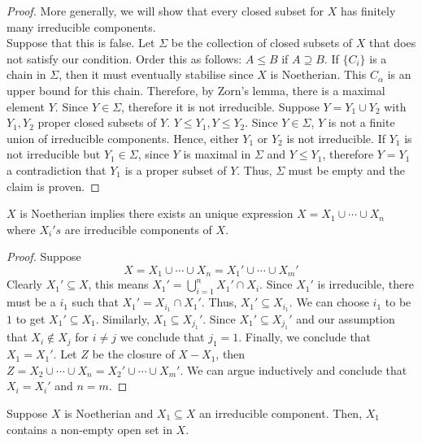 \documentclass[oneside, 12pt, ]{scrbook}
\theoremstyle{theorem}
\begin{document}
\begin{proof}
More generally, we will show that every closed subset for $X$ has finitely many irreducible components. \\

Suppose that this is false. Let $\Sigma$ be the collection of closed subsets of $X$ that does not satisfy our condition. Order this as follows: $A \le B$ if $A \supseteq B$. If $\{C_{i}\}$ is a chain in $\Sigma$, then it must eventually stabilise since $X$ is Noetherian. This $C_{\alpha}$ is an upper bound for this chain. Therefore, by Zorn's lemma, there is a maximal element $Y$. Since $Y \in \Sigma$, therefore it is not irreducible. Suppose $Y = Y_{1} \cup Y_{2}$ with $Y_{1},Y_{2}$ proper closed subsets of $Y$. $Y \le Y_{1}, Y \le Y_{2}$. Since $Y \in \Sigma$, $Y$ is not a finite union of irreducible components. Hence, either $Y_{1}$ or $Y_{2}$ is not irreducible. If $Y_{1}$ is not irreducible but $Y_{1} \in \Sigma$, since $Y$ is maximal in $\Sigma$ and $Y \le Y_{1}$, therefore $Y =Y_{1}$ a contradiction that $Y_{1}$ is a proper subset of $Y$. Thus, $\Sigma$ must be empty and the claim is proven. 
\end{proof}

\begin{lemma}
$X$ is Noetherian implies there exists an unique expression $X = X_{1} \cup \cdots \cup X_{n}$ where $X_{i}'s$ are irreducible components of $X$.
\end{lemma}

\begin{proof}
Suppose $$X = X_{1} \cup \cdots \cup X_{n} = X_{1}' \cup \cdots \cup X_{m}'$$ Clearly $X_{1}' \subseteq X$, this means $X_{1}' = \bigcup_{i=1}^n X_{1}' \cap X_{i}$. Since $X_{1}'$ is irreducible, there must be a $i_{1}$ such that $X_{1}' = X_{i_{1}} \cap X_{1}'$. Thus, $X_{1}' \subseteq X_{i_{1}}$. We can choose $i_{1}$ to be $1$ to get $X_{1}' \subseteq X_{1}$. Similarly, $X_{1} \subseteq X_{j_{1}}'$. Since $X_{1}' \subseteq X_{j_{1}}'$ and our assumption that $X_{i} \not \in X_{j}$ for $i \neq j$ we conclude that $j_{1}=1$. Finally, we conclude that $X_{1}=X_{1}'$. Let $Z$ be the closure of $X - X_{1}$, then $Z = X_{2} \cup \cdots \cup X_{n} = X_{2}' \cup \cdots \cup X_{m}' $. We can argue inductively and conclude that $X_{i} = X_{i}'$ and $n=m$. 
\end{proof}

\begin{lemma}
Suppose $X$ is Noetherian and $X_{1} \subseteq X$ an irreducible component. Then, $X_{1}$ contains a non-empty open set in $X$.
\end{lemma}
\end{document}
